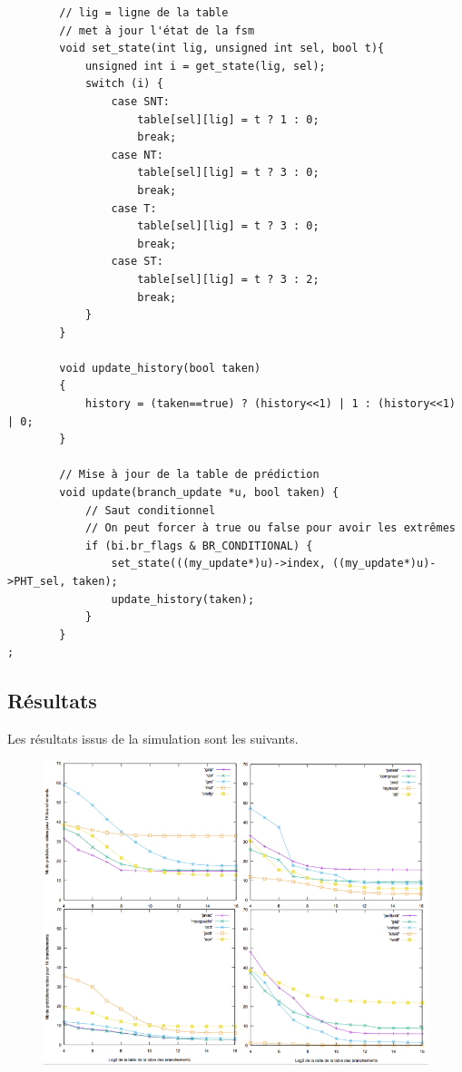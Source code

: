 \documentclass[a4paper]{article}
\begin{document}
\begin{verbatim}
        // lig = ligne de la table 
        // met à jour l'état de la fsm
        void set_state(int lig, unsigned int sel, bool t){
            unsigned int i = get_state(lig, sel);
            switch (i) {
                case SNT:
                    table[sel][lig] = t ? 1 : 0;
                    break;
                case NT:
                    table[sel][lig] = t ? 3 : 0;
                    break;
                case T:
                    table[sel][lig] = t ? 3 : 0;
                    break;
                case ST:
                    table[sel][lig] = t ? 3 : 2;
                    break;
            }
        }

        void update_history(bool taken)
        {
            history = (taken==true) ? (history<<1) | 1 : (history<<1) | 0;
        }

        // Mise à jour de la table de prédiction
        void update(branch_update *u, bool taken) {
            // Saut conditionnel
            // On peut forcer à true ou false pour avoir les extrêmes
            if (bi.br_flags & BR_CONDITIONAL) {
                set_state(((my_update*)u)->index, ((my_update*)u)->PHT_sel, taken);
                update_history(taken);
            }
        }
;
\end{verbatim}
\normalsize

\subsection{Résultats}

Les résultats issus de la simulation sont les suivants.
\begin{figure}[t]
\includegraphics[width=\linewidth]{2-bit-correle.png}
\centering
\end{figure}
\end{document}
